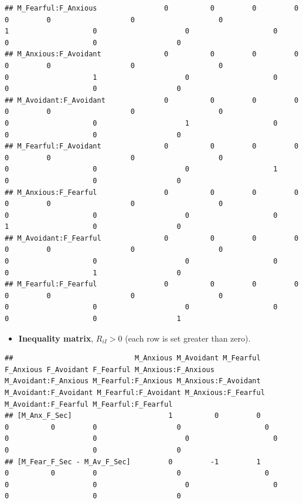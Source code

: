 \documentclass[
]{book}
\providecommand{\tightlist}{%
  \setlength{\itemsep}{0pt}\setlength{\parskip}{0pt}}
\begin{document}
\begin{verbatim}
## M_Fearful:F_Anxious                0          0         0         0          0         0                   0                    0                   1                    0                     0                    0                   0                    0                   0
## M_Anxious:F_Avoidant               0          0         0         0          0         0                   0                    0                   0                    1                     0                    0                   0                    0                   0
## M_Avoidant:F_Avoidant              0          0         0         0          0         0                   0                    0                   0                    0                     1                    0                   0                    0                   0
## M_Fearful:F_Avoidant               0          0         0         0          0         0                   0                    0                   0                    0                     0                    1                   0                    0                   0
## M_Anxious:F_Fearful                0          0         0         0          0         0                   0                    0                   0                    0                     0                    0                   1                    0                   0
## M_Avoidant:F_Fearful               0          0         0         0          0         0                   0                    0                   0                    0                     0                    0                   0                    1                   0
## M_Fearful:F_Fearful                0          0         0         0          0         0                   0                    0                   0                    0                     0                    0                   0                    0                   1
\end{verbatim}

\begin{itemize}
\tightlist
\item
  \textbf{Inequality matrix}, \(R_{iI} > 0\) (each row is set greater than zero).
\end{itemize}

\begin{verbatim}
##                             M_Anxious M_Avoidant M_Fearful F_Anxious F_Avoidant F_Fearful M_Anxious:F_Anxious M_Avoidant:F_Anxious M_Fearful:F_Anxious M_Anxious:F_Avoidant M_Avoidant:F_Avoidant M_Fearful:F_Avoidant M_Anxious:F_Fearful M_Avoidant:F_Fearful M_Fearful:F_Fearful
## [M_Anx_F_Sec]                       1          0         0         0          0         0                   0                    0                   0                    0                     0                    0                   0                    0                   0
## [M_Fear_F_Sec - M_Av_F_Sec]         0         -1         1         0          0         0                   0                    0                   0                    0                     0                    0                   0                    0                   0
\end{verbatim}
\end{document}
